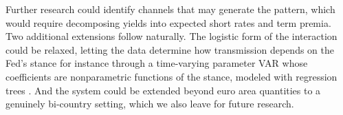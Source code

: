 Further research could identify channels that may generate the pattern, which would require decomposing yields into expected short rates and term premia. Two additional extensions follow naturally. The logistic form of the interaction could be relaxed, letting the data determine how transmission depends on the Fed's stance for instance through a time-varying parameter VAR whose coefficients are nonparametric functions of the stance, modeled with regression trees \citep{hauzenberger2025bayesian}. And the system could be extended beyond euro area quantities to a genuinely bi-country setting, which we also leave for future research.
